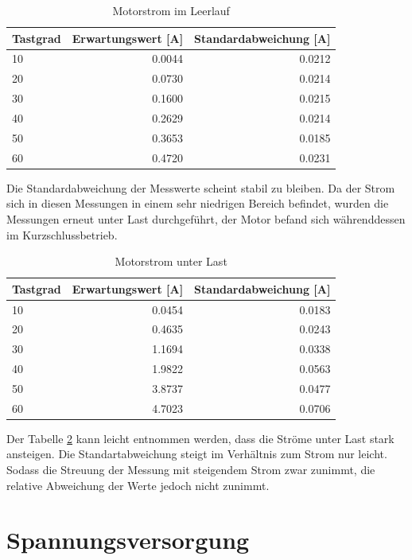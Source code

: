 \begin{table}[H]
  \centering
  \begin{tabularx}{\textwidth}{|X|r|r|}
    \hline
    Tastgrad & Erwartungswert [A] & Standardabweichung [A]  \\ \hline \hline
    10 & 0.0044 & 0.0212\\ \hline
    20 & 0.0730 & 0.0214\\ \hline
    30 & 0.1600 & 0.0215\\ \hline
    40 & 0.2629 & 0.0214\\ \hline
    50 & 0.3653 & 0.0185\\ \hline
    60 & 0.4720 & 0.0231\\ \hline

  \end{tabularx}
  \caption{Motorstrom im Leerlauf}%
  \label{tab:current_noload}
\end{table}

Die Standardabweichung der Messwerte scheint stabil zu bleiben. Da der Strom sich in diesen Messungen in einem sehr niedrigen Bereich befindet, wurden
die Messungen erneut unter Last durchgeführt, der Motor befand sich währenddessen im Kurzschlussbetrieb.

\begin{table}[H]
  \centering
  \begin{tabularx}{\textwidth}{|X|r|r|}
    \hline
    Tastgrad & Erwartungswert [A] & Standardabweichung [A]  \\ \hline \hline
    10 & 0.0454 & 0.0183\\ \hline
    20 & 0.4635 & 0.0243\\ \hline
    30 & 1.1694 & 0.0338\\ \hline
    40 & 1.9822 & 0.0563\\ \hline
    50 & 3.8737 & 0.0477\\ \hline
    60 & 4.7023 & 0.0706\\ \hline
  \end{tabularx}
  \caption{Motorstrom unter Last}%
  \label{tab:current_load}
\end{table}

Der Tabelle \ref{tab:current_load} kann leicht entnommen werden, dass die Ströme unter Last stark ansteigen. Die Standartabweichung steigt im Verhältnis zum Strom nur leicht.
Sodass die Streuung der Messung mit steigendem Strom zwar zunimmt, die relative Abweichung der Werte jedoch nicht zunimmt.


\section{Spannungsversorgung}


